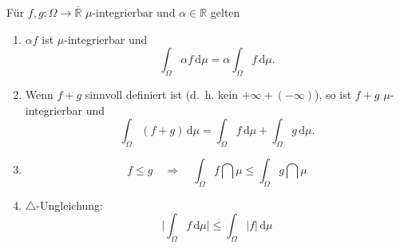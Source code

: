 \begin{lemma}
	F\"ur $ f, g \! : \Omega \rightarrow \overline{\mathbb{R}}$ $\mu$-integrierbar und $\alpha \in \mathbb{R}$ gelten
	\begin{enumerate}[label=(\roman*)]
		\item $\alpha f$ ist $\mu$-integrierbar und \[ \int_{\Omega} \alpha f \,\mathrm{d}\mu = \alpha \int_{\Omega} f\, \mathrm{d}\mu. \]
		\item Wenn $f+g$ sinnvoll definiert ist (\mbox{d. h.} kein $+\infty + (-\infty)$), so ist $f + g$ $\mu$-integrierbar und \[ \int_{\Omega} (f + g) \,\mathrm{d}\mu = \int_{\Omega} f \,\mathrm{d}\mu + \int_{\Omega} g\, \mathrm{d}\mu. \]
		\item \[ f \leq g \quad \Rightarrow \quad \int_{\Omega} f \dint \mu \leq \int_{\Omega} g \dint \mu \]
		\item $\triangle$-Ungleichung: 
		\[ \Big|\int_{\Omega} f \,\mathrm{d}\mu\Big| \leq \int_{\Omega} |f| \,\mathrm{d}\mu\]
	\end{enumerate}
\end{lemma}

